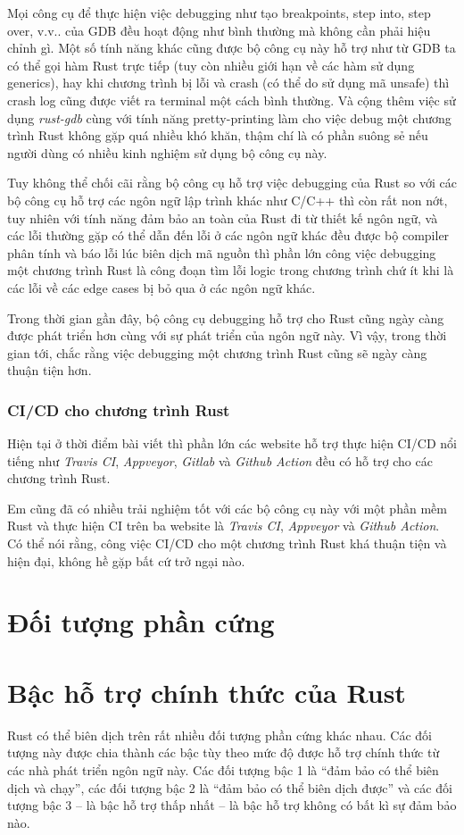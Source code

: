 Mọi công cụ để thực hiện việc debugging như tạo breakpoints, step into, step over, v.v.. của GDB đều hoạt động như bình thường mà không cần phải hiệu chỉnh gì.
Một số tính năng khác cũng được bộ công cụ này hỗ trợ như từ GDB ta có thể gọi hàm Rust trực tiếp (tuy còn nhiều giới hạn về các hàm sử dụng generics), hay khi chương trình bị lỗi và crash (có thể do sử dụng mã unsafe) thì crash log cũng được viết ra terminal một cách bình thường.
Và cộng thêm việc sử dụng \emph{rust-gdb} cùng với tính năng pretty-printing làm cho việc debug một chương trình Rust không gặp quá nhiều khó khăn, thậm chí là có phần suông sẻ nếu người dùng có nhiều kinh nghiệm sử dụng bộ công cụ này.

Tuy không thể chối cãi rằng bộ công cụ hỗ trợ việc debugging của Rust so với các bộ công cụ hỗ trợ các ngôn ngữ lập trình khác như C/C++ thì còn rất non nớt, tuy nhiên với tính năng đảm bảo an toàn của Rust đi từ thiết kế ngôn ngữ, và các lỗi thường gặp có thể dẫn đến lỗi ở các ngôn ngữ khác đều được bộ compiler phân tính và báo lỗi lúc biên dịch mã nguồn thì phần lớn công việc debugging một chương trình Rust là công đoạn tìm lỗi logic trong chương trình chứ ít khi là các lỗi về các edge cases bị bỏ qua ở các ngôn ngữ khác.

Trong thời gian gần đây, bộ công cụ debugging hỗ trợ cho Rust cũng ngày càng được phát triển hơn cùng với sự phát triển của ngôn ngữ này.
Vì vậy, trong thời gian tới, chắc rằng việc debugging một chương trình Rust cũng sẽ ngày càng thuận tiện hơn.
\subsubsection{CI/CD cho chương trình Rust}
Hiện tại ở thời điểm bài viết thì phần lớn các website hỗ trợ thực hiện CI/CD nổi tiếng như \emph{Travis CI}, \emph{Appveyor}, \emph{Gitlab} và \emph{Github Action} đều có hỗ trợ cho các chương trình Rust.

Em cũng đã có nhiều trải nghiệm tốt với các bộ công cụ này với một phần mềm Rust và thực hiện CI trên ba website là \emph{Travis CI}, \emph{Appveyor} và \emph{Github Action}.
Có thể nói rằng, công việc CI/CD cho một chương trình Rust khá thuận tiện và hiện đại, không hề gặp bất cứ trở ngại nào.

\section{Đối tượng phần cứng}
\section{Bậc hỗ trợ chính thức của Rust}
Rust có thể biên dịch trên rất nhiều đối tượng phần cứng khác nhau.
Các đối tượng này được chia thành các bậc tùy theo mức độ được hỗ trợ chính thức từ các nhà phát triển ngôn ngữ này.
Các đối tượng bậc 1 là ``đảm bảo có thể biên dịch và chạy'', các đối tượng bậc 2 là ``đảm bảo có thể biên dịch được'' và các đối tượng bậc 3 -- là bậc hỗ trợ thấp nhất -- là bậc hỗ trợ không có bất kì sự đảm bảo nào.

